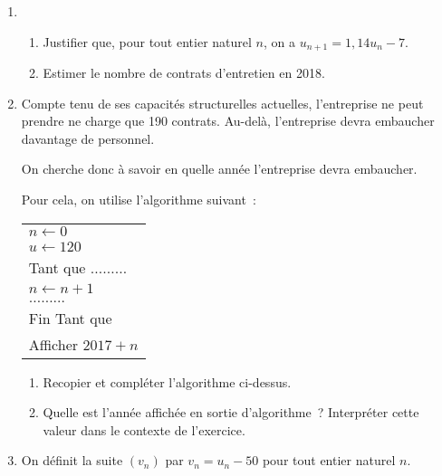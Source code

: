 \begin{enumerate}
     \item
     \begin{enumerate}[label=\alph*.]
          \item Justifier que, pour tout entier naturel $n$, on a $u_{n+1}=1,14 u_n-7$.
          \item Estimer le nombre de contrats d'entretien en 2018.
     \end{enumerate}
     \item Compte tenu de ses capacités structurelles actuelles, l'entreprise ne peut prendre ne charge que 190 contrats. Au-delà, l'entreprise devra embaucher davantage de personnel.
     \par
     On cherche donc à savoir en quelle année l'entreprise devra embaucher.
     \par
     Pour cela, on utilise l'algorithme suivant~:
     \begin{center}
          \begin{extern}%
               \renewcommand{\arraystretch}{1.25}
               \begin{tabularx}{0.3\linewidth}{|X|}
                    \hline
                    $n\longleftarrow 0$\\
                    $u\longleftarrow 120$\\
                    Tant que $\ldots\ldots\ldots$\\
                    \hspace*{1cm} $n\longleftarrow n+1$\\
                    \hspace*{1cm} $\ldots\ldots\ldots$\\
                    Fin Tant que\\
                    Afficher $2017+n$\\
                    \hline
               \end{tabularx}
          \end{extern}
     \end{center}
     \begin{enumerate}[label=\alph*.]
          \item Recopier et compléter l'algorithme ci-dessus.
          \item Quelle est l'année affichée en sortie d'algorithme~? Interpréter cette valeur dans le contexte de l'exercice.
     \end{enumerate}
     \item On définit la suite $(v_n)$ par $v_n=u_n-50$ pour tout entier naturel $n$.

\end{enumerate}
